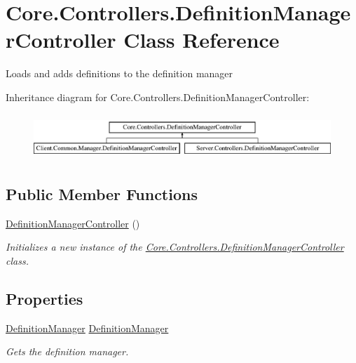 \hypertarget{classCore_1_1Controllers_1_1DefinitionManagerController}{}\section{Core.\+Controllers.\+Definition\+Manager\+Controller Class Reference}
\label{classCore_1_1Controllers_1_1DefinitionManagerController}


Loads and adds definitions to the definition manager  


Inheritance diagram for Core.\+Controllers.\+Definition\+Manager\+Controller\+:\begin{figure}[H]
\begin{center}
\leavevmode
\includegraphics[height=1.733746cm]{classCore_1_1Controllers_1_1DefinitionManagerController}
\end{center}
\end{figure}
\subsection*{Public Member Functions}
\begin{DoxyCompactItemize}
\item 
\hyperlink{classCore_1_1Controllers_1_1DefinitionManagerController_a39c6221581415fe3703b81ec4cf7bee1}{Definition\+Manager\+Controller} ()
\begin{DoxyCompactList}\small\item\em Initializes a new instance of the \hyperlink{classCore_1_1Controllers_1_1DefinitionManagerController}{Core.\+Controllers.\+Definition\+Manager\+Controller} class. \end{DoxyCompactList}\end{DoxyCompactItemize}
\subsection*{Properties}
\begin{DoxyCompactItemize}
\item 
\hyperlink{classCore_1_1Models_1_1DefinitionManager}{Definition\+Manager} \hyperlink{classCore_1_1Controllers_1_1DefinitionManagerController_ada4b684abad134fa15ed076dccb20a89}{Definition\+Manager}
\begin{DoxyCompactList}\small\item\em Gets the definition manager. \end{DoxyCompactList}\end{DoxyCompactItemize}


